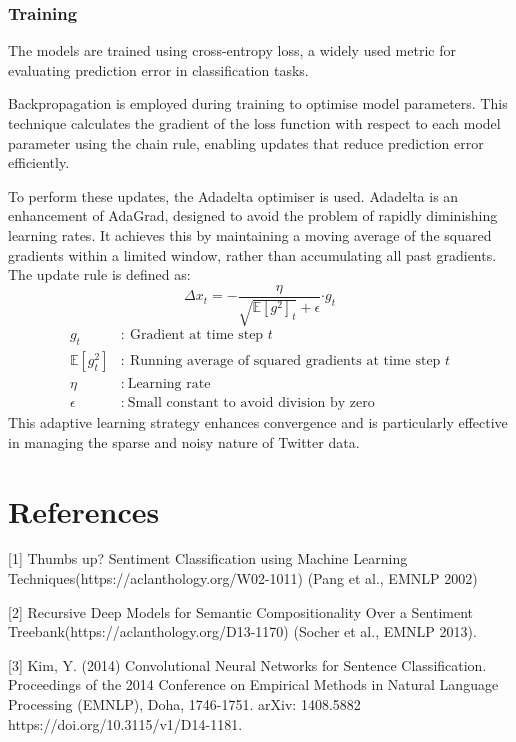 \documentclass{article}
\begin{document}
\subsubsection{Training}

The models are trained using cross-entropy loss, a widely used metric for evaluating prediction error in classification tasks.

Backpropagation is employed during training to optimise model parameters. This technique calculates the gradient of the loss function with respect to each model parameter using the chain rule, enabling updates that reduce prediction error efficiently.

To perform these updates, the Adadelta optimiser is used. Adadelta is an enhancement of AdaGrad, designed to avoid the problem of rapidly diminishing learning rates. It achieves this by maintaining a moving average of the squared gradients within a limited window, rather than accumulating all past gradients. The update rule is defined as:
\[
\Delta x_t = - \frac{\eta }{\sqrt{\mathbb{E}[g^2]_t} + \epsilon}{\cdot g_t}
\]
\[
\begin{aligned}
g_t &:\ \text{Gradient at time step } t \\
\mathbb{E}[g_t^2] &:\ \text{Running average of squared gradients at time step } t \\
\eta &:\ \text{Learning rate} \\
\epsilon &:\ \text{Small constant to avoid division by zero}
\end{aligned}
\]
This adaptive learning strategy enhances convergence and is particularly effective in managing the sparse and noisy nature of Twitter data.

\section*{References}

\small
[1] Thumbs up? Sentiment Classification using Machine Learning Techniques(https://aclanthology.org/W02-1011) (Pang et al., EMNLP 2002)

[2] Recursive Deep Models for Semantic Compositionality Over a Sentiment Treebank(https://aclanthology.org/D13-1170) (Socher et al., EMNLP 2013).

[3] Kim, Y. (2014) Convolutional Neural Networks for Sentence Classification. Proceedings of the 2014
Conference on Empirical Methods in Natural Language Processing (EMNLP), Doha, 1746-1751. arXiv:
1408.5882 https://doi.org/10.3115/v1/D14-1181.
\end{document}
